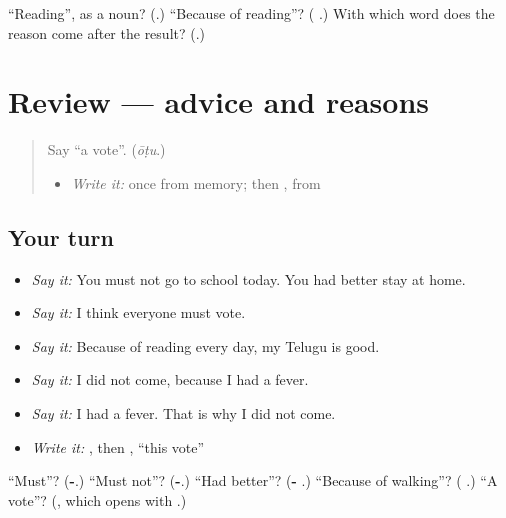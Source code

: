 \begin{tcolorbox}[breakable,colback=teal!4,colframe=teal!35!black,title={Before you move on}]
\textquotedblleft{}Reading\textquotedblright{}, as a noun? (\textbf{}.) \textquotedblleft{}Because of reading\textquotedblright{}? (\textbf{ }.) With which word does the reason come after the result? (\textbf{}.)
\end{tcolorbox}
\section[(review)]{Review — advice and reasons}

\label{lesson:TE-R319-advice-and-reasons}



\begin{quote}
Say \textquotedblleft{}a vote\textquotedblright{}. (\emph{ōṭu}.)

\begin{itemize}
\raggedright
  \item \emph{Write it:} \textbf{} once from memory; then \textbf{}, from \textbf{}
\end{itemize}
\end{quote}

\subsection*{Your turn}
\begin{itemize}
\raggedright
  \item \emph{Say it:} You must not go to school today. You had better stay at home.
  \item \emph{Say it:} I think everyone must vote.
  \item \emph{Say it:} Because of reading every day, my Telugu is good.
  \item \emph{Say it:} I did not come, because I had a fever.
  \item \emph{Say it:} I had a fever. That is why I did not come.
  \item \emph{Write it:} \textbf{}, then \textbf{ }, \textquotedblleft{}this vote\textquotedblright{}
\end{itemize}

\begin{tcolorbox}[breakable,colback=teal!4,colframe=teal!35!black,title={Before you move on}]
\textquotedblleft{}Must\textquotedblright{}? (\textbf{-}.) \textquotedblleft{}Must not\textquotedblright{}? (\textbf{-}.) \textquotedblleft{}Had better\textquotedblright{}? (\textbf{- }.) \textquotedblleft{}Because of walking\textquotedblright{}? (\textbf{ }.) \textquotedblleft{}A vote\textquotedblright{}? (\textbf{}, which opens with \textbf{}.)
\end{tcolorbox}
